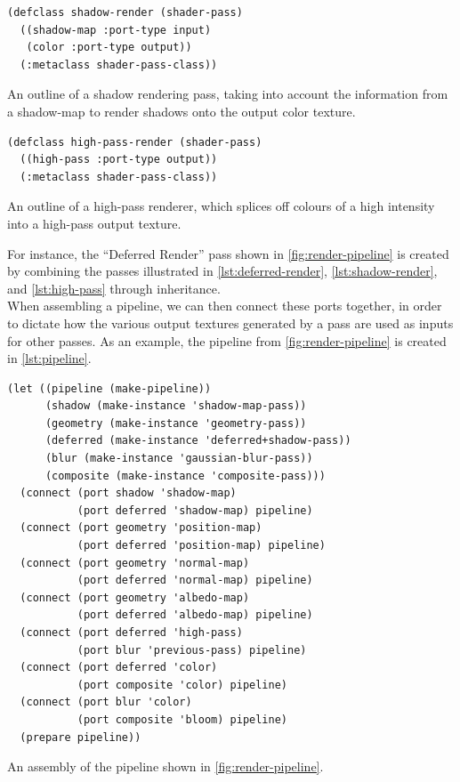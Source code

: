 \documentclass[format=sigconf]{acmart}
\begin{document}
\begin{listing}[h]
\begin{verbatim}
(defclass shadow-render (shader-pass)
  ((shadow-map :port-type input)
   (color :port-type output))
  (:metaclass shader-pass-class))
\end{verbatim}
\caption{An outline of a shadow rendering pass, taking into account the information from a shadow-map to render shadows onto the output color texture.}
\label{lst:shadow-render}
\end{listing}

\begin{listing}[h]
\begin{verbatim}
(defclass high-pass-render (shader-pass)
  ((high-pass :port-type output))
  (:metaclass shader-pass-class))
\end{verbatim}
\caption{An outline of a high-pass renderer, which splices off colours of a high intensity into a high-pass output texture.}
\label{lst:high-pass}
\end{listing}

For instance, the ``Deferred Render'' pass shown in \autoref{fig:render-pipeline} is created by combining the passes illustrated in \autoref{lst:deferred-render}, \autoref{lst:shadow-render}, and \autoref{lst:high-pass} through inheritance. \\

When assembling a pipeline, we can then connect these ports together, in order to dictate how the various output textures generated by a pass are used as inputs for other passes. As an example, the pipeline from \autoref{fig:render-pipeline} is created in \autoref{lst:pipeline}. \\

\begin{listing}[h]
\begin{verbatim}
(let ((pipeline (make-pipeline))
      (shadow (make-instance 'shadow-map-pass))
      (geometry (make-instance 'geometry-pass))
      (deferred (make-instance 'deferred+shadow-pass))
      (blur (make-instance 'gaussian-blur-pass))
      (composite (make-instance 'composite-pass)))
  (connect (port shadow 'shadow-map) 
           (port deferred 'shadow-map) pipeline)
  (connect (port geometry 'position-map)
           (port deferred 'position-map) pipeline)
  (connect (port geometry 'normal-map)
           (port deferred 'normal-map) pipeline)
  (connect (port geometry 'albedo-map)
           (port deferred 'albedo-map) pipeline)
  (connect (port deferred 'high-pass)
           (port blur 'previous-pass) pipeline)
  (connect (port deferred 'color)
           (port composite 'color) pipeline)
  (connect (port blur 'color)
           (port composite 'bloom) pipeline)
  (prepare pipeline))
\end{verbatim}
\caption{An assembly of the pipeline shown in \autoref{fig:render-pipeline}.}
\label{lst:pipeline}
\end{listing}
\end{document}
